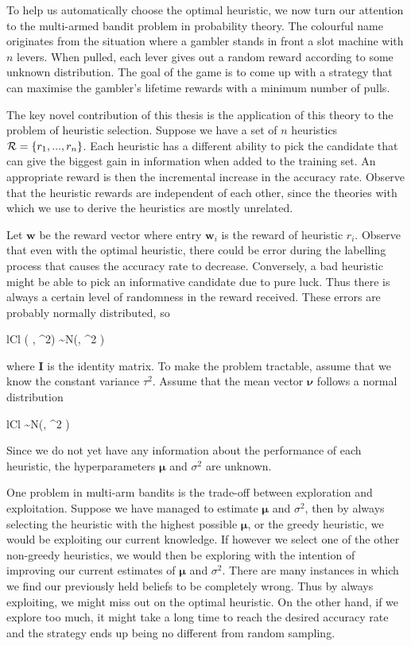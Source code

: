 To help us automatically choose the optimal heuristic, 
we now turn our attention to the multi-armed bandit problem in probability theory. The colourful
name originates from the situation where a gambler stands in front a slot machine with $n$ levers.
When pulled, each lever gives out a random reward according to some unknown distribution.
The goal of the game is to come up with a strategy that can maximise the gambler's
lifetime rewards with a minimum number of pulls.

The key novel contribution of this thesis is the application of this theory to the problem of
heuristic selection. Suppose we have a set of $n$ heuristics $ \mathcal{R} = \{r_1, ..., r_n \}$. Each heuristic
has a different ability to pick the candidate that can give the biggest gain in information
when added to the training set. An appropriate reward is then the incremental increase
in the accuracy rate. Observe that the heuristic rewards are independent of each other,
since the theories with which we use to derive the heuristics are mostly unrelated.

Let $\bm{w}$ be the reward vector where entry $\bm{w}_i$ is the reward of heuristic $r_i$.
Observe that even with the optimal heuristic, there could be error during the labelling
process that causes the accuracy rate to decrease. Conversely, a bad heuristic might be
able to pick an informative candidate due to pure luck. Thus there is always a certain level
of randomness in the reward received. These errors are probably normally distributed, so
	\begin{IEEEeqnarray*}{lCl}
		( \mid \bm{\nu}, \tau^2) \sim N(\bm{\nu}, \tau^2 )
	\end{IEEEeqnarray*}
where $\bm{I}$ is the identity matrix.
To make the problem tractable, assume that we know the constant variance $\tau^2$. Assume that
the mean vector $\bm{\nu}$ follows a normal distribution
	\begin{IEEEeqnarray*}{lCl}
		\bm{\nu} \sim N(\bm{\mu}, \sigma^2 )
	\end{IEEEeqnarray*}
Since we do not yet have any information about the performance of each heuristic,
the hyperparameters $\bm{\mu}$ and $\sigma^2$ are unknown.

One problem in multi-arm bandits is the trade-off between exploration and exploitation.
Suppose we have managed to estimate $\bm{\mu}$ and $\sigma^2$, then by always selecting
the heuristic with the highest possible $\bm{\mu}$, or the greedy heuristic,
we would be exploiting our current
knowledge. If however we select one of the other non-greedy heuristics, we would then be exploring
with the intention of improving our current estimates of $\bm{\mu}$ and $\sigma^2$. There are
many instances in which we find our previously held beliefs to be completely wrong. Thus
by always exploiting, we might miss out on the optimal heuristic. On the other hand,
if we explore too much, it might take a long time to reach the desired accuracy rate and
the strategy ends up being no different from random sampling. 


